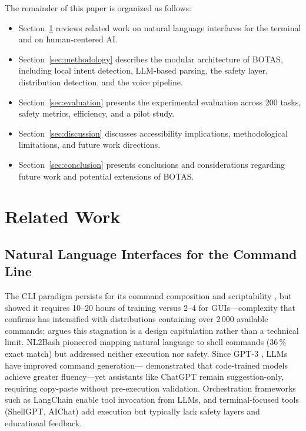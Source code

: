 \documentclass[10pt,a4paper]{article}
\begin{document}
The remainder of this paper is organized as follows:
\begin{itemize}[noitemsep,topsep=2pt]
    \item Section~\ref{sec:related-work} reviews related work on natural language interfaces for the terminal and on human-centered AI.
    \item Section~\ref{sec:methodology} describes the modular architecture of BOTAS, including local intent detection, LLM-based parsing, the safety layer, distribution detection, and the voice pipeline.
    \item Section~\ref{sec:evaluation} presents the experimental evaluation across 200 tasks, safety metrics, efficiency, and a pilot study.
    \item Section~\ref{sec:discussion} discusses accessibility implications, methodological limitations, and future work directions.
    \item Section~\ref{sec:conclusion} presents conclusions and considerations regarding future work and potential extensions of BOTAS.
\end{itemize}


\section{Related Work}
\label{sec:related-work}

\subsection{Natural Language Interfaces for the Command Line}
\label{subsec:cli-usability}

The CLI paradigm persists for its command composition and scriptability \citep{Raymond2003}, but \citet{Nielsen1994} showed it requires 10--20 hours of training versus 2--4 for GUIs---complexity that \citet{Dix2004} confirms has intensified with distributions containing over 2\,000 available commands; \citet{Jenson2024} argues this stagnation is a design capitulation rather than a technical limit. NL2Bash \citep{Lin2018} pioneered mapping natural language to shell commands (36\,\% exact match) but addressed neither execution nor safety. Since GPT-3 \citep{Brown2020}, LLMs have improved command generation---\citet{Chen2021} demonstrated that code-trained models achieve greater fluency---yet assistants like ChatGPT \citep{OpenAI2023} remain suggestion-only, requiring copy-paste without pre-execution validation. Orchestration frameworks such as LangChain \citep{Chase2022} enable tool invocation from LLMs, and terminal-focused tools (ShellGPT, AIChat) add execution but typically lack safety layers and educational feedback.
\end{document}
